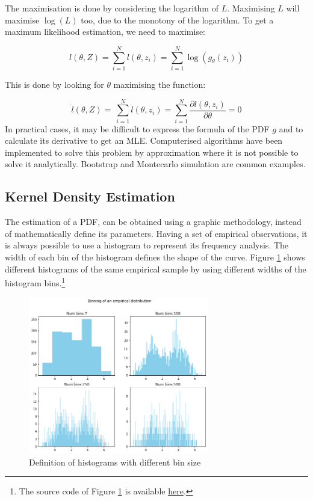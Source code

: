 The maximisation is done by considering the logarithm of $L$. Maximising $L$ will maximise $\log(L)$ too, due to the monotony of the logarithm. To get a maximum likelihood estimation, we need to maximise:

\begin{equation}
l\left(\theta,Z\right)=\sum_{i=1}^{N}{l\left(\theta,z_i\right)=\sum_{i=1}^{N}\log{\left(g_\theta\left(z_i\right)\right)}}
\label{eq_MLE2}
\end{equation}

This is done by looking for $\theta$ maximising the function:

\begin{equation}
\dot{l}\left(\theta,Z\right)=\ \sum_{i=1}^{N}{\dot{l}\left(\theta,z_i\right)=\sum_{i=1}^{N}{\frac{\partial l\left(\theta,z_i\right)}{\partial\theta}=0}}
\label{eq_MLE3}
\end{equation}
In practical cases, it may be difficult to express the formula of the PDF $g$ and to calculate its derivative to get an MLE. Computerised algorithms have been implemented to solve this problem by approximation where it is not possible to solve it analytically. Bootstrap and Montecarlo simulation are common examples.

\subsection{Kernel Density Estimation} \label{secKernelDensityEstimation}
The estimation of a PDF, can be obtained using a graphic methodology, instead of mathematically define its parameters. Having a set of empirical observations, it is always possible to use a histogram to represent its frequency analysis. The width of each bin of the histogram defines the shape of the curve. Figure \ref{fig_empiricalBinning} shows different histograms of the same empirical sample by using different widths of the histogram bins.\footnote{The source code of Figure \ref{fig_empiricalBinning} is available \href{https://github.com/aletuf93/logproj/blob/master/examples/03.\%20Statistics.ipynb}{here}.
}

\begin{figure}[hbt!]
\centering
\includegraphics[width=0.7\textwidth]{SectionLetsMath/elemStat_figures/fig_empiricalBinning.png}
\captionsetup{type=figure}
\caption{Definition of histograms with different bin size}
\label{fig_empiricalBinning}
\end{figure}

